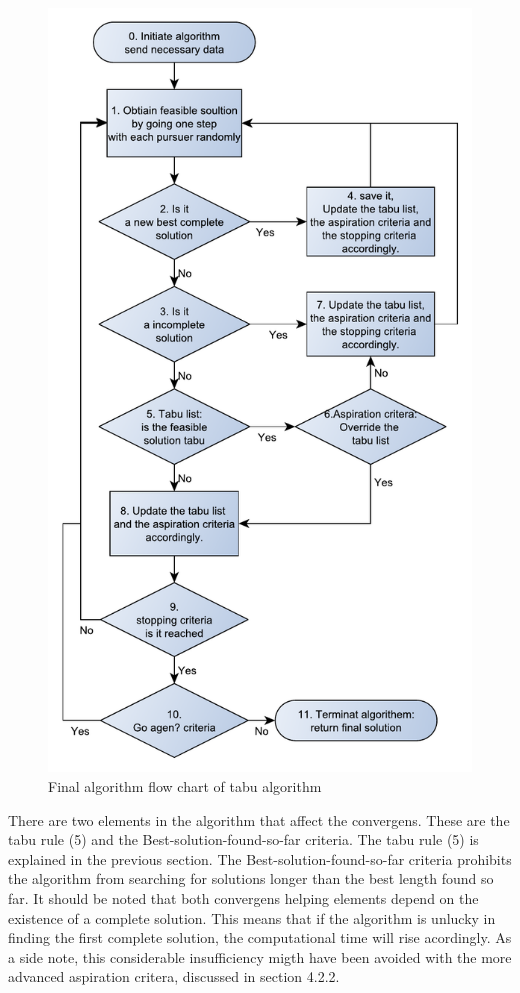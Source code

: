 \begin{figure}[!h]
	\centering
	\includegraphics[width=\textwidth]{chapter_4_methods/ny_Tabu}
  	\caption[Final algorithm flow chart of tabu algorithm]
  	{Final algorithm flow chart of tabu algorithm}
\end{figure}


There are two elements in the algorithm that affect the convergens. These are the tabu rule (5) and the Best-solution-found-so-far criteria. The tabu rule (5) is explained in the previous section. The Best-solution-found-so-far criteria prohibits the algorithm from searching for solutions longer than the best length found so far. It should be noted that both convergens helping elements depend on the existence of a complete solution. This means that if the algorithm is unlucky in finding the first complete solution, the computational time will rise acordingly. As a side note, this considerable insufficiency migth have been avoided with the more advanced aspiration critera, discussed in section 4.2.2.

